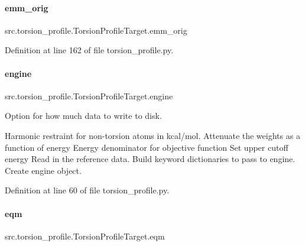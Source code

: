 \paragraph{\texorpdfstring{emm\+\_\+orig}{emm\_orig}}
{\footnotesize\ttfamily src.\+torsion\+\_\+profile.\+Torsion\+Profile\+Target.\+emm\+\_\+orig}



Definition at line 162 of file torsion\+\_\+profile.\+py.

\mbox{\label{classsrc_1_1torsion__profile_1_1TorsionProfileTarget_a9d0dc0a03ec67c2902215f7ca7f57264}} 
\paragraph{\texorpdfstring{engine}{engine}}
{\footnotesize\ttfamily src.\+torsion\+\_\+profile.\+Torsion\+Profile\+Target.\+engine}



Option for how much data to write to disk. 

Harmonic restraint for non-\/torsion atoms in kcal/mol. Attenuate the weights as a function of energy Energy denominator for objective function Set upper cutoff energy Read in the reference data. Build keyword dictionaries to pass to engine. Create engine object. 

Definition at line 60 of file torsion\+\_\+profile.\+py.

\mbox{\label{classsrc_1_1torsion__profile_1_1TorsionProfileTarget_a2ddb079e4264001b9e1a38c923694ae2}} 
\paragraph{\texorpdfstring{eqm}{eqm}}
{\footnotesize\ttfamily src.\+torsion\+\_\+profile.\+Torsion\+Profile\+Target.\+eqm}



